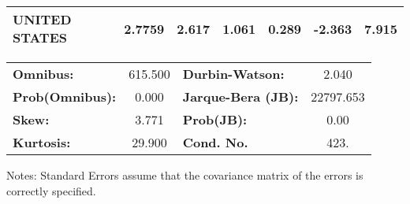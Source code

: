 \documentclass[ 11pt]{article}
\begin{document}
\begin{center}
\begin{tabular}{lcccccc}
\textbf{UNITED STATES}  &       2.7759  &        2.617     &     1.061  &         0.289        &       -2.363    &        7.915     \\
\bottomrule
\end{tabular}
\begin{tabular}{lclc}
\textbf{Omnibus:}       & 615.500 & \textbf{  Durbin-Watson:     } &     2.040  \\
\textbf{Prob(Omnibus):} &   0.000 & \textbf{  Jarque-Bera (JB):  } & 22797.653  \\
\textbf{Skew:}          &   3.771 & \textbf{  Prob(JB):          } &      0.00  \\
\textbf{Kurtosis:}      &  29.900 & \textbf{  Cond. No.          } &      423.  \\
\bottomrule
\end{tabular}
\end{center}

Notes: \newline
 [1] Standard Errors assume that the covariance matrix of the errors is correctly specified.
\end{document}

